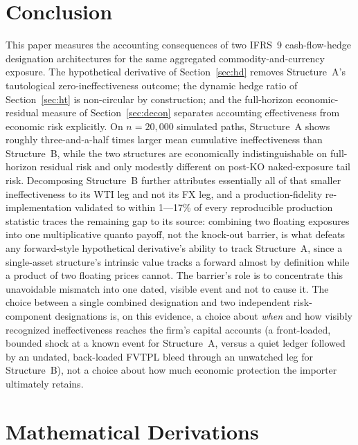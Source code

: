 \documentclass[11pt,a4paper]{article}
\begin{document}
\section{Conclusion}
\label{sec:conclusion}

This paper measures the accounting consequences of two IFRS~9 cash-flow-hedge designation architectures for the same aggregated commodity-and-currency exposure. The hypothetical derivative of Section~\ref{sec:hd} removes Structure~A's tautological zero-ineffectiveness outcome; the dynamic hedge ratio of Section~\ref{sec:ht} is non-circular by construction; and the full-horizon economic-residual measure of Section~\ref{sec:decon} separates accounting effectiveness from economic risk explicitly. On $n=20{,}000$ simulated paths, Structure~A shows roughly three-and-a-half times larger mean cumulative ineffectiveness than Structure~B, while the two structures are economically indistinguishable on full-horizon residual risk and only modestly different on post-KO naked-exposure tail risk. Decomposing Structure~B further attributes essentially all of that smaller ineffectiveness to its WTI leg and not its FX leg, and a production-fidelity re-implementation validated to within 1---17\% of every reproducible production statistic traces the remaining gap to its source: combining two floating exposures into one multiplicative quanto payoff, not the knock-out barrier, is what defeats any forward-style hypothetical derivative's ability to track Structure~A, since a single-asset structure's intrinsic value tracks a forward almost by definition while a product of two floating prices cannot. The barrier's role is to concentrate this unavoidable mismatch into one dated, visible event and not to cause it. The choice between a single combined designation and two independent risk-component designations is, on this evidence, a choice about \emph{when} and how visibly recognized ineffectiveness reaches the firm's capital accounts (a front-loaded, bounded shock at a known event for Structure~A, versus a quiet ledger followed by an undated, back-loaded FVTPL bleed through an unwatched leg for Structure~B), not a choice about how much economic protection the importer ultimately retains.

\appendix
\section{Mathematical Derivations}
\label{sec:appendix}
\end{document}
